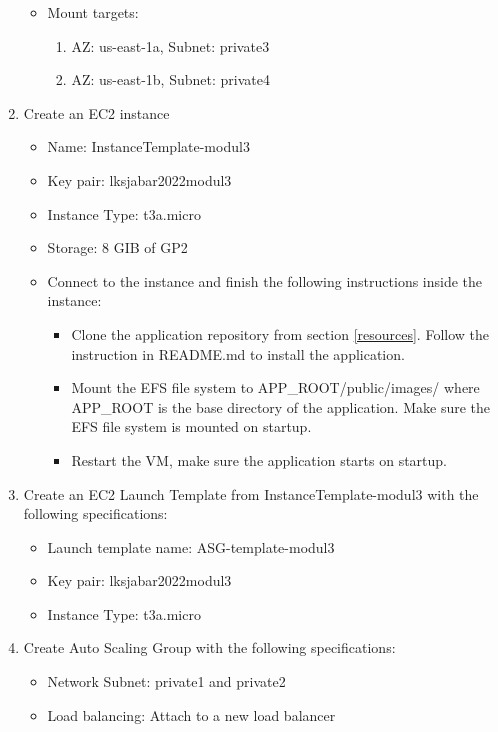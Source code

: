 \documentclass{article}
\begin{document}
\begin{enumerate}
\begin{itemize}
        \item Mount targets:
        \begin{enumerate}
            \item AZ: us-east-1a, Subnet: private3
            \item AZ: us-east-1b, Subnet: private4
        \end{enumerate}
    \end{itemize}
    \item Create an EC2 instance
    \begin{itemize}
        \item Name: InstanceTemplate-modul3
        \item Key pair: lksjabar2022modul3
        \item Instance Type: t3a.micro
        \item Storage: 8 GIB of GP2
        \item Connect to the instance and finish the following instructions inside the instance:
        \begin{itemize}
            \item Clone the application repository from section \ref{resources}. Follow the instruction in README.md to install the application.
            \item Mount the EFS file system to APP\_ROOT/public/images/ where APP\_ROOT is the base directory of the application. Make sure the EFS file system is mounted on startup.
            \item Restart the VM, make sure the application starts on startup.
        \end{itemize}
    \end{itemize}
    \item Create an EC2 Launch Template from InstanceTemplate-modul3 with the following specifications:
    \begin{itemize}
        \item Launch template name: ASG-template-modul3
        \item Key pair: lksjabar2022modul3
        \item Instance Type: t3a.micro
    \end{itemize}
    \item Create Auto Scaling Group with the following specifications:
    \begin{itemize}
        \item Network Subnet: private1 and private2
        \item Load balancing: Attach to a new load balancer

\end{itemize}
\end{enumerate}
\end{document}

